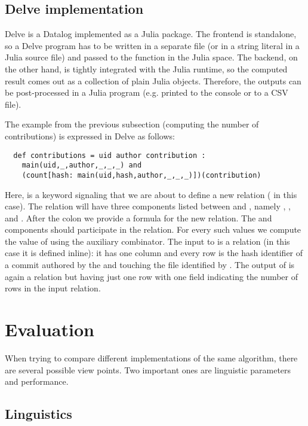 \subsection{Delve implementation}

Delve is a Datalog implemented as a Julia package. The frontend is standalone,
so a Delve program has to be written in a separate file (or in a string literal in a Julia
source file) and passed to the  function in the Julia space.
The backend, on the other hand, is tightly integrated with the Julia runtime, so
the computed result comes out as a collection of plain Julia objects. Therefore,
the outputs can be post-processed in a Julia program
(e.g. printed to the console or to a CSV file).

The example from the previous subsection (computing the number of contributions)
is expressed in Delve as follows:
\begin{verbatim}
  def contributions = uid author contribution :
    main(uid,_,author,_,_,_) and
    (count[hash: main(uid,hash,author,_,_,_)])(contribution)
\end{verbatim}
Here,  is a keyword signaling that we are about to define a new relation
( in this case). The relation will have three components
listed between \m{=} and \m{:}, namely , , and .
After the colon we provide a formula for the new relation. The  and
 components should participate in the  relation. For every
such values we compute the value of  using the auxiliary
 combinator. The input to  is a relation (in this case it is
defined inline): it has one column  and every row is the hash
identifier of a commit authored by the  and touching the file
identified by . The output of  is again a relation but having just one row
with one field indicating the number of rows in the input relation.

\section{Evaluation}

When trying to compare different implementations of the same algorithm, there
are several possible view points. Two important ones are linguistic parameters
and performance.

\subsection{Linguistics}

